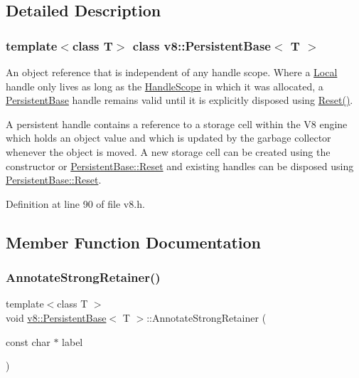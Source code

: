 \subsection{Detailed Description}
\subsubsection*{template$<$class T$>$\newline
class v8\+::\+Persistent\+Base$<$ T $>$}

An object reference that is independent of any handle scope. Where a \mbox{\hyperlink{classv8_1_1Local}{Local}} handle only lives as long as the \mbox{\hyperlink{classv8_1_1HandleScope}{Handle\+Scope}} in which it was allocated, a \mbox{\hyperlink{classv8_1_1PersistentBase}{Persistent\+Base}} handle remains valid until it is explicitly disposed using \mbox{\hyperlink{classv8_1_1PersistentBase_a174bb1e45b18fd4eeaee033622825bb8}{Reset()}}.

A persistent handle contains a reference to a storage cell within the V8 engine which holds an object value and which is updated by the garbage collector whenever the object is moved. A new storage cell can be created using the constructor or \mbox{\hyperlink{classv8_1_1PersistentBase_a174bb1e45b18fd4eeaee033622825bb8}{Persistent\+Base\+::\+Reset}} and existing handles can be disposed using \mbox{\hyperlink{classv8_1_1PersistentBase_a174bb1e45b18fd4eeaee033622825bb8}{Persistent\+Base\+::\+Reset}}. 

Definition at line 90 of file v8.\+h.



\subsection{Member Function Documentation}
\mbox{\label{classv8_1_1PersistentBase_a27ddb6118b13225207e9641c1e6c8c91}} 
\subsubsection{\texorpdfstring{Annotate\+Strong\+Retainer()}{AnnotateStrongRetainer()}}
{\footnotesize\ttfamily template$<$class T $>$ \\
void \mbox{\hyperlink{classv8_1_1PersistentBase}{v8\+::\+Persistent\+Base}}$<$ T $>$\+::Annotate\+Strong\+Retainer (\begin{DoxyParamCaption}\item[{const char $\ast$}]{label }\end{DoxyParamCaption})}


